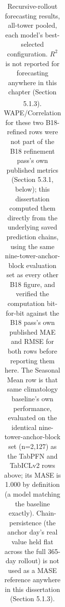 \begin{table}[h]
{\begin{tabular}{@{}l p{7.4cm} c c c c@{}}
\bottomrule
\end{tabular}%
}
\caption{Recursive-rollout forecasting results, all-tower pooled, each model's best-selected
configuration. $R^2$ is not reported for forecasting anywhere in this chapter (Section 5.1.3).
\textsuperscript{\dag}WAPE/Correlation for these two B18-refined rows were not part of the B18
refinement pass's own published metrics (Section 5.3.1, below); this dissertation computed them
directly from the underlying saved prediction chains, using the same nine-tower-anchor-block
evaluation set as every other B18 figure, and verified the computation bit-for-bit against the B18
pass's own published MAE and RMSE for both rows before reporting them here. The Seasonal Mean row
is that same climatology baseline's own performance, evaluated on the identical nine-tower-anchor-block
set (n=2,127) as the TabPFN and TabICLv2 rows above; its MASE is 1.000 by definition (a model matching
the baseline exactly). Chain-persistence (the anchor day's real value held flat across the full
365-day rollout) is not used as a MASE reference anywhere in this dissertation (Section 5.1.3).}
\end{table}

